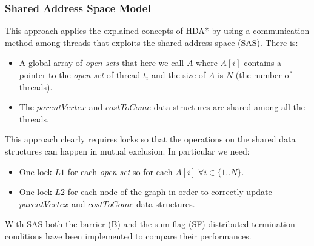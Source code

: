\documentclass[twocolumn, switch]{article} %
\begin{document}
\subsubsection{Shared Address Space Model}
This approach applies the explained concepts of HDA* by using a communication method
among threads that exploits the shared address space (SAS). There is:
\begin{itemize}
  \item A global array of \textit{open sets} that here we call $A$ where
        $A[i]$ contains a pointer to the \textit{open set} of thread $t_i$ and the size
        of $A$ is $N$ (the number of threads).
  \item The $parentVertex$ and $costToCome$ data structures are shared among all the threads.
\end{itemize}
This approach clearly requires locks so that the operations on the shared data structures
can happen in mutual exclusion. In particular we need:
\begin{itemize}
  \item One lock $L1$ for each \textit{open set} so for each $A[i] \;\forall i \in \{1..N\}$.
  \item One lock $L2$ for each node of the graph in order to correctly update $parentVertex$ and $costToCome$ data structures.
\end{itemize}
With SAS both the barrier (B) and the sum-flag (SF) distributed termination conditions
have been implemented to compare their performances.
\end{document}
